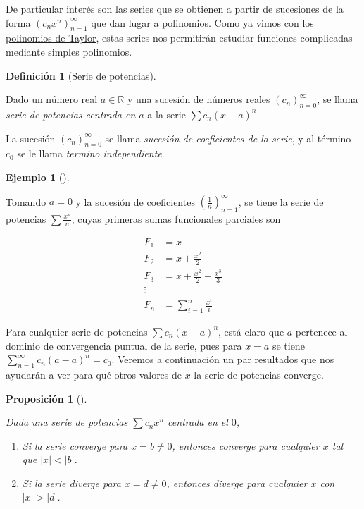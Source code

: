 \documentclass[
  a4paper,
]{scrreport}
\providecommand{\tightlist}{%
  \setlength{\itemsep}{0pt}\setlength{\parskip}{0pt}}\usepackage{longtable,booktabs,array}
\theoremstyle{plain}
\theoremstyle{plain}
\newtheorem{proposition}{Proposición}[chapter]
\theoremstyle{definition}
\newtheorem{definition}{Definición}[chapter]
\theoremstyle{definition}
\newtheorem{example}{Ejemplo}[chapter]
\theoremstyle{plain}
\theoremstyle{remark}
\begin{document}
De particular interés son las series que se obtienen a partir de
sucesiones de la forma \((c_nx^n)_{n=1}^\infty\) que dan lugar a
polinomios. Como ya vimos con los
\protect\hyperlink{polinomios-de-taylor}{polinomios de Taylor}, estas
series nos permitirán estudiar funciones complicadas mediante simples
polinomios.

\leavevmode{}%
\begin{definition}[Serie de potencias]\label{def-serie-potencias}

Dado un número real \(a\in\mathbb{R}\) y una sucesión de números reales
\((c_n)_{n=0}^\infty\), se llama \emph{serie de potencias centrada en
\(a\)} a la serie \(\sum c_n(x-a)^n\).

La sucesión \((c_n)_{n=0}^\infty\) se llama \emph{sucesión de
coeficientes de la serie}, y al término \(c_0\) se le llama
\emph{termino independiente}.

\end{definition}

\leavevmode{}%
\begin{example}[]\label{exm-serie-potencias}

Tomando \(a=0\) y la sucesión de coeficientes
\(\left(\frac{1}{n}\right)_{n=1}^\infty\), se tiene la serie de
potencias \(\sum \frac{x^n}{n}\), cuyas primeras sumas funcionales
parciales son

\begin{align*}
F_1 &= x\\ 
F_2 &= x+\frac{x^2}{2}\\ 
F_3 &= x+\frac{x^2}{2}+\frac{x^3}{3}\\ 
\vdots\\ 
F_n &= \sum_{i=1}^n \frac{x^i}{i}
\end{align*}

\end{example}

Para cualquier serie de potencias \(\sum c_n(x-a)^n\), está claro que
\(a\) pertenece al dominio de convergencia puntual de la serie, pues
para \(x=a\) se tiene \(\sum_{n=1}^\infty c_n(a-a)^n = c_0\). Veremos a
continuación un par resultados que nos ayudarán a ver para qué otros
valores de \(x\) la serie de potencias converge.

\leavevmode{}%
\begin{proposition}[]\label{prp-intervalo-convergencia-serie-potencias}

Dada una serie de potencias \(\sum c_nx^n\) centrada en el \(0\),

\begin{enumerate}
\def\labelenumi{\alph{enumi}.}
\tightlist
\item
  Si la serie converge para \(x=b\neq 0\), entonces converge para
  cualquier \(x\) tal que \(|x|<|b|\).
\item
  Si la serie diverge para \(x=d\neq 0\), entonces diverge para
  cualquier \(x\) con \(|x|>|d|\).
\end{enumerate}

\end{proposition}
\end{document}
